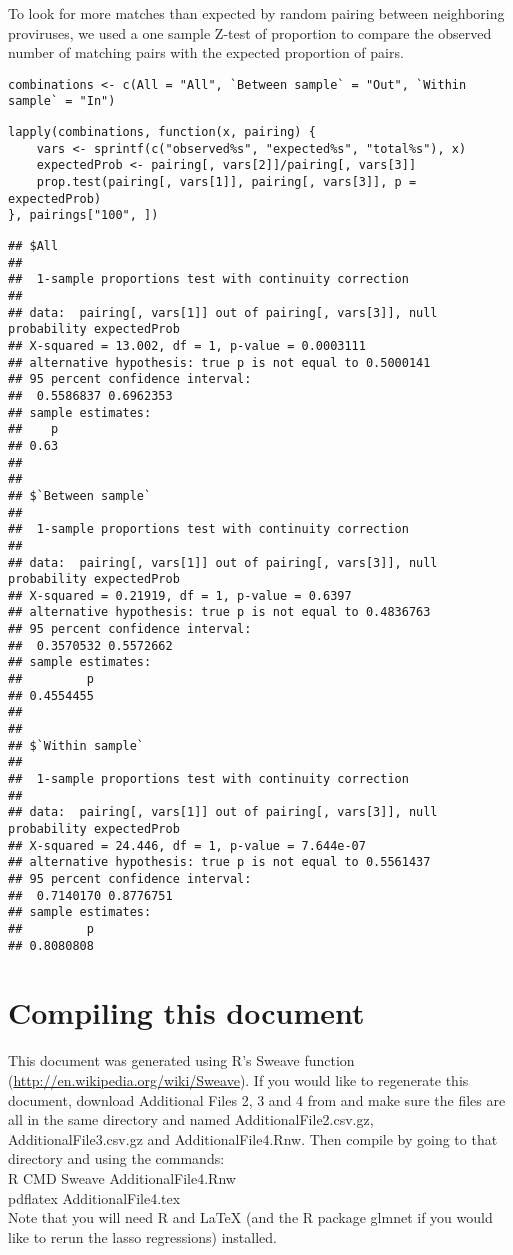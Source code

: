 \documentclass[../../sherrill-Mix_thesis.tex]{subfiles}
\makeatletter
\newenvironment{kframe}{%
 \def\at@end@of@kframe{}%
 \ifinner\ifhmode%
  \def\at@end@of@kframe{\end{minipage}}%
  \begin{minipage}{\columnwidth}%
 \fi\fi%
 \def\FrameCommand##1{\hskip\@totalleftmargin \hskip-\fboxsep
 \colorbox{shadecolor}{##1}\hskip-\fboxsep
     \hskip-\linewidth \hskip-\@totalleftmargin \hskip\columnwidth}%
 \MakeFramed {\advance\hsize-\width
   \@totalleftmargin\z@ \linewidth\hsize
   \@setminipage}}%
 {\par\unskip\endMakeFramed%
 \at@end@of@kframe}
\newenvironment{knitrout}{}{} %
\makeatother
\begin{document}
To look for more matches than expected by random pairing between neighboring proviruses, we used a one sample Z-test of proportion to compare the observed number of matching pairs with the expected proportion of pairs.
\begin{knitrout}
\color{fgcolor}\begin{kframe}
\begin{lstlisting}[basicstyle=\ttfamily,breaklines=true]
combinations <- c(All = "All", `Between sample` = "Out", `Within sample` = "In")\end{lstlisting}
\begin{lstlisting}[basicstyle=\ttfamily,breaklines=true]
lapply(combinations, function(x, pairing) {
    vars <- sprintf(c("observed%s", "expected%s", "total%s"), x)
    expectedProb <- pairing[, vars[2]]/pairing[, vars[3]]
    prop.test(pairing[, vars[1]], pairing[, vars[3]], p = expectedProb)
}, pairings["100", ])\end{lstlisting}
\begin{lstlisting}[basicstyle=\ttfamily,breaklines=true]
## $All
## 
## 	1-sample proportions test with continuity correction
## 
## data:  pairing[, vars[1]] out of pairing[, vars[3]], null probability expectedProb
## X-squared = 13.002, df = 1, p-value = 0.0003111
## alternative hypothesis: true p is not equal to 0.5000141
## 95 percent confidence interval:
##  0.5586837 0.6962353
## sample estimates:
##    p 
## 0.63 
## 
## 
## $`Between sample`
## 
## 	1-sample proportions test with continuity correction
## 
## data:  pairing[, vars[1]] out of pairing[, vars[3]], null probability expectedProb
## X-squared = 0.21919, df = 1, p-value = 0.6397
## alternative hypothesis: true p is not equal to 0.4836763
## 95 percent confidence interval:
##  0.3570532 0.5572662
## sample estimates:
##         p 
## 0.4554455 
## 
## 
## $`Within sample`
## 
## 	1-sample proportions test with continuity correction
## 
## data:  pairing[, vars[1]] out of pairing[, vars[3]], null probability expectedProb
## X-squared = 24.446, df = 1, p-value = 7.644e-07
## alternative hypothesis: true p is not equal to 0.5561437
## 95 percent confidence interval:
##  0.7140170 0.8776751
## sample estimates:
##         p 
## 0.8080808
\end{lstlisting}
\end{kframe}
\end{knitrout}
\section{Compiling this document}
This document was generated using R's Sweave function (\url{http://en.wikipedia.org/wiki/Sweave}). If you would like to regenerate this document, download Additional Files 2, 3 and 4 from \citet{Sherrill-Mix2013} and make sure the files are all in the same directory and named AdditionalFile2.csv.gz, AdditionalFile3.csv.gz and AdditionalFile4.Rnw. Then compile by going to that directory and using the commands:\\
R CMD Sweave AdditionalFile4.Rnw\\
pdflatex AdditionalFile4.tex\\

Note that you will need R and \LaTeX{} (and the R package glmnet if you would like to rerun the lasso regressions) installed.
\end{document}
